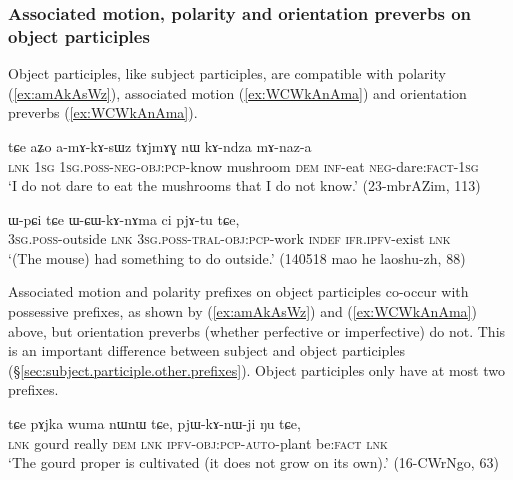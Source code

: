 \subsubsection{Associated motion, polarity and orientation preverbs on object participles}  \label{sec:object.participle.other.prefixes}
Object participles, like subject participles, are compatible with polarity (\ref{ex:amAkAsWz}), associated motion (\ref{ex:WCWkAnAma}) and orientation preverbs (\ref{ex:WCWkAnAma}).

\begin{exe}
\ex  \label{ex:amAkAsWz}
\gll tɕe aʑo a-mɤ-kɤ-sɯz tɤjmɤɣ nɯ kɤ-ndza mɤ-naz-a \\
\textsc{lnk} \textsc{1sg} \textsc{1sg}.\textsc{poss}-\textsc{neg}-\textsc{obj}:\textsc{pcp}-know mushroom \textsc{dem} \textsc{inf}-eat \textsc{neg}-dare:\textsc{fact}-\textsc{1sg}  \\
\glt `I do not dare to eat the mushrooms that I do not know.' (23-mbrAZim, 113)
\end{exe}

\begin{exe}
\ex  \label{ex:WCWkAnAma}
\gll ɯ-pɕi tɕe ɯ-ɕɯ-kɤ-nɤma ci pjɤ-tu tɕe, \\
\textsc{3sg}.\textsc{poss}-outside \textsc{lnk} \textsc{3sg}.\textsc{poss}-\textsc{tral}-\textsc{obj}:\textsc{pcp}-work \textsc{indef} \textsc{ifr}.\textsc{ipfv}-exist \textsc{lnk} \\
\glt  `(The mouse) had something to do outside.' (140518 mao he laoshu-zh, 88)
\end{exe}

Associated motion and polarity prefixes on object participles co-occur with possessive prefixes, as shown by  (\ref{ex:amAkAsWz}) and  (\ref{ex:WCWkAnAma})  above, but orientation preverbs (whether perfective or imperfective) do not. This is an important difference between subject and object participles (§\ref{sec:subject.participle.other.prefixes}). Object participles only have at most two prefixes.

\begin{exe}
\ex  \label{ex:pjWKAnWji}
\gll tɕe pɤjka wuma nɯnɯ tɕe, pjɯ-kɤ-nɯ-ji ŋu tɕe, \\
\textsc{lnk} gourd really \textsc{dem} \textsc{lnk} \textsc{ipfv}-\textsc{obj}:\textsc{pcp}-\textsc{auto}-plant be:\textsc{fact} \textsc{lnk} \\
\glt `The gourd proper is cultivated (it does not grow on its own).' (16-CWrNgo, 63)
\end{exe}

